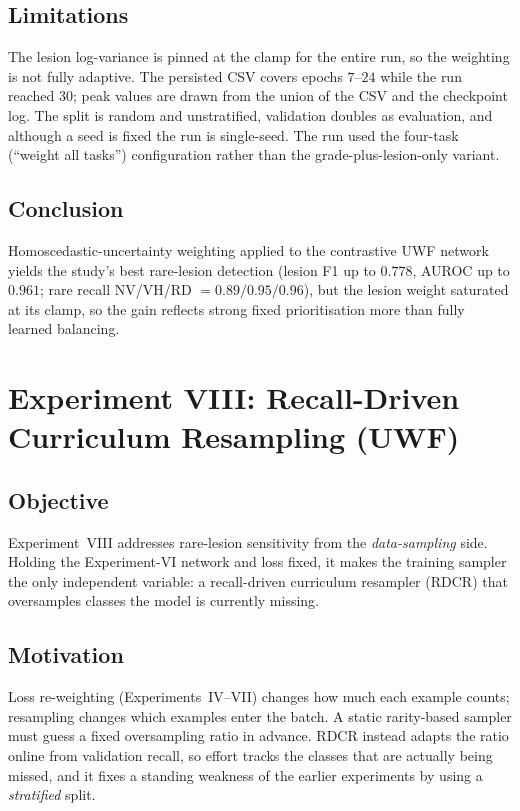 \documentclass[journal,twoside,web]{ieeecolor}
\begin{document}
\subsection{Limitations}
The lesion log-variance is pinned at the clamp for the entire run, so the
weighting is not fully adaptive. The persisted CSV covers epochs $7$--$24$ while the
run reached $30$; peak values are drawn from the union of the CSV and the checkpoint
log. The split is random and unstratified, validation doubles as evaluation, and
although a seed is fixed the run is single-seed. The run used the four-task
(``weight all tasks'') configuration rather than the grade-plus-lesion-only variant.

\subsection{Conclusion}
Homoscedastic-uncertainty weighting applied to the contrastive UWF network yields
the study's best rare-lesion detection (lesion F1 up to $0.778$, AUROC up to
$0.961$; rare recall NV/VH/RD $=0.89/0.95/0.96$), but the lesion weight saturated at
its clamp, so the gain reflects strong fixed prioritisation more than fully learned
balancing.

\section{Experiment VIII: Recall-Driven Curriculum Resampling (UWF)}
\label{sec:exp8}

\subsection{Objective}
Experiment~VIII addresses rare-lesion sensitivity from the \emph{data-sampling}
side. Holding the Experiment-VI network and loss fixed, it makes the training
sampler the only independent variable: a recall-driven curriculum resampler
(RDCR) that oversamples classes the model is currently missing.

\subsection{Motivation}
Loss re-weighting (Experiments~IV--VII) changes how much each example counts;
resampling changes which examples enter the batch. A static rarity-based sampler
must guess a fixed oversampling ratio in advance. RDCR instead adapts the ratio
online from validation recall, so effort tracks the classes that are actually being
missed, and it fixes a standing weakness of the earlier experiments by using a
\emph{stratified} split.
\end{document}
